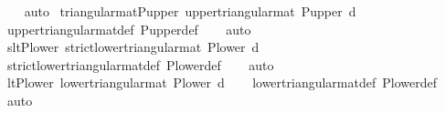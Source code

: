 \begin{isabellebody}
\ \ \isamarkupfalse%
\ auto%
\endisatagproof
{\isafoldproof}%
%
\isadelimproof
\isanewline
%
\endisadelimproof
\isanewline
{}\isamarkupfalse%
\ triangular{\isacharunderscore}{\kern0pt}mat{\isacharunderscore}{\kern0pt}P{\isacharunderscore}{\kern0pt}upper{\isacharcolon}{\kern0pt}\ {\isachardoublequoteopen}upper{\isacharunderscore}{\kern0pt}triangular{\isacharunderscore}{\kern0pt}mat\ {\isacharparenleft}{\kern0pt}P{\isacharunderscore}{\kern0pt}upper\ d{\isacharparenright}{\kern0pt}{\isachardoublequoteclose}\isanewline
%
\isadelimproof
\ \ %
\endisadelimproof
%
\isatagproof
{}\isamarkupfalse%
\ upper{\isacharunderscore}{\kern0pt}triangular{\isacharunderscore}{\kern0pt}mat{\isacharunderscore}{\kern0pt}def\ P{\isacharunderscore}{\kern0pt}upper{\isacharunderscore}{\kern0pt}def\isanewline
\ \ \isamarkupfalse%
\ auto%
\endisatagproof
{\isafoldproof}%
%
\isadelimproof
\isanewline
%
\endisadelimproof
\isanewline
{}\isamarkupfalse%
\ slt{\isacharunderscore}{\kern0pt}P{\isacharunderscore}{\kern0pt}lower{\isacharcolon}{\kern0pt}\ {\isachardoublequoteopen}strict{\isacharunderscore}{\kern0pt}lower{\isacharunderscore}{\kern0pt}triangular{\isacharunderscore}{\kern0pt}mat\ {\isacharparenleft}{\kern0pt}P{\isacharunderscore}{\kern0pt}lower\ d{\isacharparenright}{\kern0pt}{\isachardoublequoteclose}\isanewline
%
\isadelimproof
\ \ %
\endisadelimproof
%
\isatagproof
{}\isamarkupfalse%
\ strict{\isacharunderscore}{\kern0pt}lower{\isacharunderscore}{\kern0pt}triangular{\isacharunderscore}{\kern0pt}mat{\isacharunderscore}{\kern0pt}def\ P{\isacharunderscore}{\kern0pt}lower{\isacharunderscore}{\kern0pt}def\isanewline
\ \ \isamarkupfalse%
\ auto%
\endisatagproof
{\isafoldproof}%
%
\isadelimproof
\isanewline
%
\endisadelimproof
\isanewline
{}\isamarkupfalse%
\ lt{\isacharunderscore}{\kern0pt}P{\isacharunderscore}{\kern0pt}lower{\isacharcolon}{\kern0pt}\ {\isachardoublequoteopen}lower{\isacharunderscore}{\kern0pt}triangular{\isacharunderscore}{\kern0pt}mat\ {\isacharparenleft}{\kern0pt}P{\isacharunderscore}{\kern0pt}lower\ d{\isacharparenright}{\kern0pt}{\isachardoublequoteclose}\isanewline
%
\isadelimproof
\ \ %
\endisadelimproof
%
\isatagproof
{}\isamarkupfalse%
\ lower{\isacharunderscore}{\kern0pt}triangular{\isacharunderscore}{\kern0pt}mat{\isacharunderscore}{\kern0pt}def\ P{\isacharunderscore}{\kern0pt}lower{\isacharunderscore}{\kern0pt}def\isanewline
\ \ \isamarkupfalse%
\ auto%
\endisatagproof
{\isafoldproof}%
%
\isadelimproof

\end{isabellebody}

